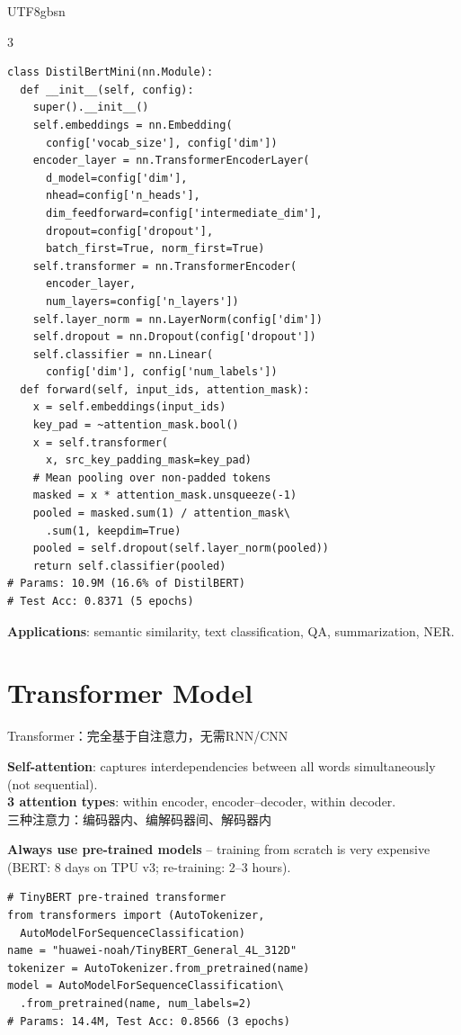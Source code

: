 \documentclass[9pt,landscape,a4paper]{article}
\newcommand{\zhint}[1]{{\scriptsize\color{gray!70!black}#1}}
\begin{document}
\begin{CJK}{UTF8}{gbsn}
\begin{multicols}{3}
\begin{lstlisting}
class DistilBertMini(nn.Module):
  def __init__(self, config):
    super().__init__()
    self.embeddings = nn.Embedding(
      config['vocab_size'], config['dim'])
    encoder_layer = nn.TransformerEncoderLayer(
      d_model=config['dim'],
      nhead=config['n_heads'],
      dim_feedforward=config['intermediate_dim'],
      dropout=config['dropout'],
      batch_first=True, norm_first=True)
    self.transformer = nn.TransformerEncoder(
      encoder_layer,
      num_layers=config['n_layers'])
    self.layer_norm = nn.LayerNorm(config['dim'])
    self.dropout = nn.Dropout(config['dropout'])
    self.classifier = nn.Linear(
      config['dim'], config['num_labels'])
  def forward(self, input_ids, attention_mask):
    x = self.embeddings(input_ids)
    key_pad = ~attention_mask.bool()
    x = self.transformer(
      x, src_key_padding_mask=key_pad)
    # Mean pooling over non-padded tokens
    masked = x * attention_mask.unsqueeze(-1)
    pooled = masked.sum(1) / attention_mask\
      .sum(1, keepdim=True)
    pooled = self.dropout(self.layer_norm(pooled))
    return self.classifier(pooled)
# Params: 10.9M (16.6% of DistilBERT)
# Test Acc: 0.8371 (5 epochs)
\end{lstlisting}

\textbf{Applications}: semantic similarity, text classification, QA, summarization, NER.

\section{Transformer Model}
\zhint{Transformer：完全基于自注意力，无需RNN/CNN}

\textbf{Self-attention}: captures interdependencies between all words simultaneously (not sequential).\\
\textbf{3 attention types}: within encoder, encoder--decoder, within decoder.\\
\zhint{三种注意力：编码器内、编解码器间、解码器内}

\textbf{Always use pre-trained models} -- training from scratch is very expensive (BERT: 8 days on TPU v3; re-training: 2--3 hours).
\begin{lstlisting}
# TinyBERT pre-trained transformer
from transformers import (AutoTokenizer,
  AutoModelForSequenceClassification)
name = "huawei-noah/TinyBERT_General_4L_312D"
tokenizer = AutoTokenizer.from_pretrained(name)
model = AutoModelForSequenceClassification\
  .from_pretrained(name, num_labels=2)
# Params: 14.4M, Test Acc: 0.8566 (3 epochs)
\end{lstlisting}


\end{multicols}
\end{CJK}
\end{document}
